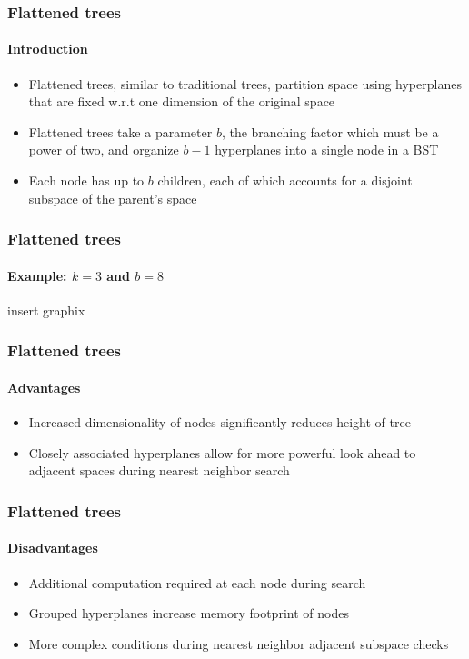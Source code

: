 
\begin{frame}
  \frametitle{Flattened \kd trees}
  \framesubtitle{Introduction}

  \begin{itemize}
    \item Flattened \kd trees, similar to traditional \kd trees, partition space using hyperplanes
      that are fixed w.r.t one dimension of the original space
    \item Flattened trees take a parameter $b$, the branching factor which must be a power of two, and
      organize $b-1$ hyperplanes into a single node in a BST
    \item Each node has up to $b$ children, each of which accounts for a disjoint subspace of the parent's
      space
  \end{itemize}

\end{frame}

\begin{frame}
  \frametitle{Flattened \kd trees}
  \framesubtitle{Example: $k=3$ and $b=8$}

  insert graphix

\end{frame}

\begin{frame}
  \frametitle{Flattened \kd trees}
  \framesubtitle{Advantages}

  \begin{itemize}
    \item Increased dimensionality of nodes significantly reduces height of tree
    \item Closely associated hyperplanes allow for more powerful look ahead to adjacent
      spaces during nearest neighbor search
  \end{itemize}

\end{frame}

\begin{frame}
  \frametitle{Flattened \kd trees}
  \framesubtitle{Disadvantages}

  \begin{itemize}
    \item Additional computation required at each node during search
    \item Grouped hyperplanes increase memory footprint of nodes 
    \item More complex conditions during nearest neighbor adjacent subspace
      checks
  \end{itemize}

\end{frame}

